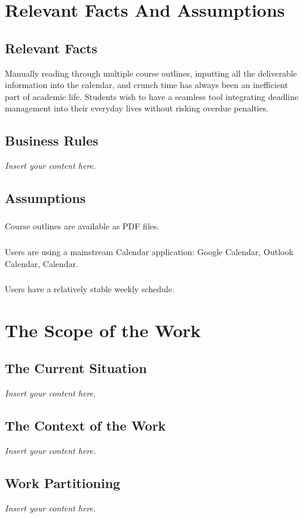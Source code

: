\documentclass[12pt]{article}
\newcommand{\lips}{\textit{Insert your content here.}}
\begin{document}
\section{Relevant Facts And Assumptions}
\subsection{Relevant Facts}
Manually reading through multiple course outlines, inputting all the deliverable information into the calendar, and crunch time has always been an inefficient part of academic life. Students wish to have a seamless tool integrating deadline management into their everyday lives without risking overdue penalties.
\subsection{Business Rules}
\lips
\subsection{Assumptions}
\subsubsection{}
Course outlines are available as PDF files.
\subsubsection{}
Users are using a mainstream Calendar application: Google Calendar, Outlook Calendar, Calendar.
\subsubsection{}
Users have a relatively stable weekly schedule.

\section{The Scope of the Work}
\subsection{The Current Situation}
\lips
\subsection{The Context of the Work}
\lips
\subsection{Work Partitioning}
\lips
\end{document}
